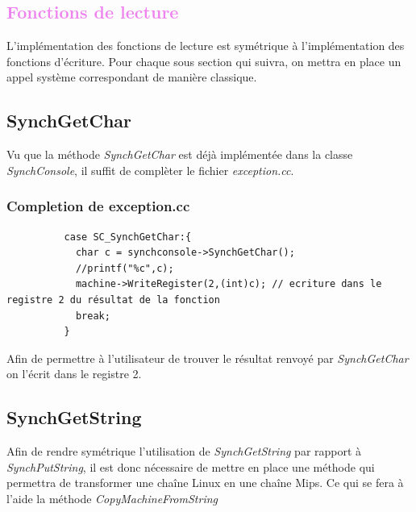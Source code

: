 \documentclass[a4paper,10pt]{article}
\begin{document}
  \textcolor{Violet}{\section{Fonctions de lecture}}
  L'implémentation des fonctions de lecture est symétrique à l'implémentation des fonctions d'écriture. Pour chaque sous section qui suivra, on mettra en place
  un appel système correspondant de manière classique.
  
   \textcolor{NavyBlue}{\subsection{SynchGetChar}}
   Vu que la méthode \emph{SynchGetChar} est déjà implémentée dans la classe \emph{SynchConsole}, il suffit de complèter le fichier \emph{exception.cc}.
   
   \textcolor{TealBlue}{\subsubsection*{Completion de exception.cc}}
   \begin{lstlisting}
          case SC_SynchGetChar:{
            char c = synchconsole->SynchGetChar();
            //printf("%c",c);
            machine->WriteRegister(2,(int)c); // ecriture dans le registre 2 du résultat de la fonction
            break;
          }    
   \end{lstlisting}
    Afin de permettre à l'utilisateur de trouver le résultat renvoyé par \emph{SynchGetChar} on l'écrit dans le registre 2.
    
     \textcolor{NavyBlue}{\subsection{SynchGetString}}
     Afin de rendre symétrique l'utilisation de \emph{SynchGetString} par rapport à \emph{SynchPutString}, il est donc nécessaire de mettre en place une 
     méthode qui permettra de transformer une chaîne Linux en une chaîne Mips. Ce qui se fera à l'aide la méthode \emph{CopyMachineFromString}
     
\end{document}
